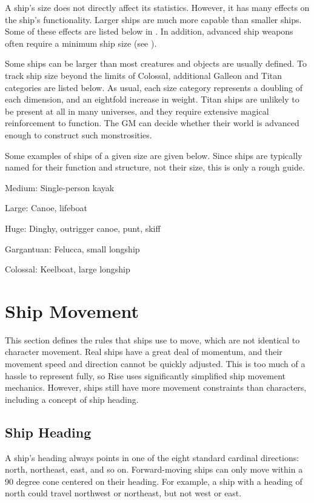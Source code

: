         A ship's size does not directly affect its statistics.
        However, it has many effects on the ship's functionality.
        Larger ships are much more capable than smaller ships.
        Some of these effects are listed below in .
        In addition, advanced ship weapons often require a minimum ship size (see ).

        Some ships can be larger than most creatures and objects are usually defined.
        To track ship size beyond the limits of Colossal, additional Galleon and Titan categories are listed below.
        As usual, each size category represents a doubling of each dimension, and an eightfold increase in weight.
        Titan ships are unlikely to be present at all in many universes, and they require extensive magical reinforcement to function.
        The GM can decide whether their world is advanced enough to construct such monstrosities.

        Some examples of ships of a given size are given below.
        Since ships are typically named for their function and structure, not their size, this is only a rough guide.
        \begin{raggeditemize}
            \item Medium: Single-person kayak
            \item Large: Canoe, lifeboat
            \item Huge: Dinghy, outrigger canoe, punt, skiff
            \item Gargantuan: Felucca, small longship
            \item Colossal: Keelboat, large longship
        \end{raggeditemize}

\section{Ship Movement}
    This section defines the rules that ships use to move, which are not identical to character movement.
    Real ships have a great deal of momentum, and their movement speed and direction cannot be quickly adjusted.
    This is too much of a hassle to represent fully, so Rise uses significantly simplified ship movement mechanics.
    However, ships still have more movement constraints than characters, including a concept of ship heading.

    \subsection{Ship Heading}
        A ship's heading always points in one of the eight standard cardinal directions: north, northeast, east, and so on.
        Forward-moving ships can only move within a 90 degree cone centered on their heading.
        For example, a ship with a heading of north could travel northwest or northeast, but not west or east.
        
